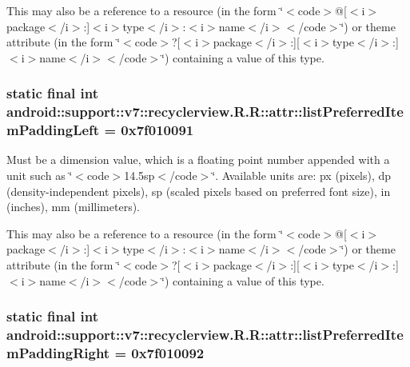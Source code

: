This may also be a reference to a resource (in the form \char`\"{}$<$code$>$@\mbox{[}$<$i$>$package$<$/i$>$:\mbox{]}$<$i$>$type$<$/i$>$:$<$i$>$name$<$/i$>$$<$/code$>$\char`\"{}) or theme attribute (in the form \char`\"{}$<$code$>$?\mbox{[}$<$i$>$package$<$/i$>$:\mbox{]}\mbox{[}$<$i$>$type$<$/i$>$:\mbox{]}$<$i$>$name$<$/i$>$$<$/code$>$\char`\"{}) containing a value of this type. \hypertarget{classandroid_1_1support_1_1v7_1_1recyclerview_1_1_r_1_1attr_c09d5100dabc17eea42b1afd39d3909c}{
\subsubsection[{listPreferredItemPaddingLeft}]{\setlength{\rightskip}{0pt plus 5cm}static final int android::support::v7::recyclerview.R.R::attr::listPreferredItemPaddingLeft = 0x7f010091}}
\label{classandroid_1_1support_1_1v7_1_1recyclerview_1_1_r_1_1attr_c09d5100dabc17eea42b1afd39d3909c}


Must be a dimension value, which is a floating point number appended with a unit such as \char`\"{}$<$code$>$14.5sp$<$/code$>$\char`\"{}. Available units are: px (pixels), dp (density-independent pixels), sp (scaled pixels based on preferred font size), in (inches), mm (millimeters). 

This may also be a reference to a resource (in the form \char`\"{}$<$code$>$@\mbox{[}$<$i$>$package$<$/i$>$:\mbox{]}$<$i$>$type$<$/i$>$:$<$i$>$name$<$/i$>$$<$/code$>$\char`\"{}) or theme attribute (in the form \char`\"{}$<$code$>$?\mbox{[}$<$i$>$package$<$/i$>$:\mbox{]}\mbox{[}$<$i$>$type$<$/i$>$:\mbox{]}$<$i$>$name$<$/i$>$$<$/code$>$\char`\"{}) containing a value of this type. \hypertarget{classandroid_1_1support_1_1v7_1_1recyclerview_1_1_r_1_1attr_1b78e8156d5ed72432afec3d62daef59}{
\subsubsection[{listPreferredItemPaddingRight}]{\setlength{\rightskip}{0pt plus 5cm}static final int android::support::v7::recyclerview.R.R::attr::listPreferredItemPaddingRight = 0x7f010092}}
\label{classandroid_1_1support_1_1v7_1_1recyclerview_1_1_r_1_1attr_1b78e8156d5ed72432afec3d62daef59}


